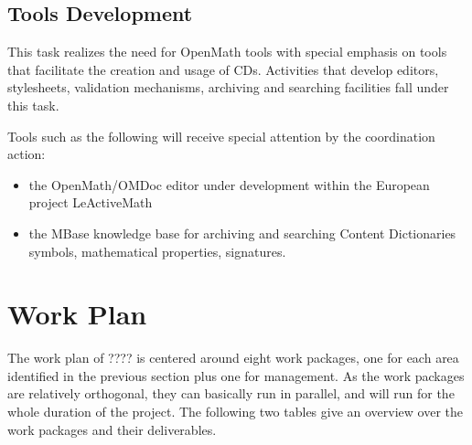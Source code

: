 \documentclass{euproposal}
\begin{document}
\subsection{Tools Development}\label{tools}

This task realizes the need for OpenMath tools with special emphasis
on tools that facilitate the creation and usage of CDs. Activities
that develop editors, stylesheets, validation mechanisms, archiving
and searching facilities fall under this task.

Tools such as the following will receive special attention by the
coordination action: 
\begin{itemize}
\item the OpenMath/OMDoc editor under development within the European project
  LeActiveMath
\item the MBase knowledge base for archiving and searching Content
  Dictionaries symbols, mathematical properties, signatures.
\end{itemize}
\section{Work Plan}

The work plan of ???? is centered around eight work packages, one for
each area identified in the previous section plus one for management.
As the work packages are relatively orthogonal, they can basically run
in parallel, and will run for the whole duration of the
project. The following two
tables give an overview over the work packages and their
deliverables.
\end{document}
